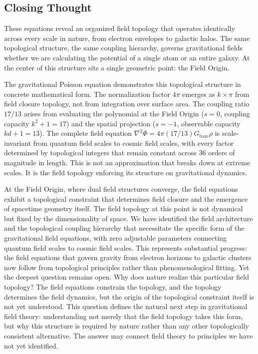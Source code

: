 \documentclass[aps,prd,preprint,superscriptaddress,showpacs,preprintnumbers,amsmath,amssymb,nofootinbib]{revtex4-2}
\begin{document}
\subsection{Closing Thought}
\label{subsec:closing}

These equations reveal an organized field topology that operates identically across every scale in nature, from electron envelopes to galactic halos. The same topological structure, the same coupling hierarchy, governs gravitational fields whether we are calculating the potential of a single atom or an entire galaxy. At the center of this structure sits a single geometric point: the Field Origin.

The gravitational Poisson equation demonstrates this topological structure in concrete mathematical form. The normalization factor $4\pi$ emerges as $k\times\pi$ from field closure topology, not from integration over surface area. The coupling ratio $17/13$ arises from evaluating the polynomial at the Field Origin ($s=0$, coupling capacity $k^2+1=17$) and the spatial projection ($s=-1$, observable capacity $kd+1=13$). The complete field equation $\nabla^2\Phi = 4\pi(17/13)G_{\text{bare}}\rho$ is scale-invariant from quantum field scales to cosmic field scales, with every factor determined by topological integers that remain constant across 36 orders of magnitude in length. This is not an approximation that breaks down at extreme scales. It is the field topology enforcing its structure on gravitational dynamics.

At the Field Origin, where dual field structures converge, the field equations exhibit a topological constraint that determines field closure and the emergence of spacetime geometry itself. The field topology at this point is not dynamical but fixed by the dimensionality of space. We have identified the field architecture and the topological coupling hierarchy that necessitate the specific form of the gravitational field equations, with zero adjustable parameters connecting quantum field scales to cosmic field scales. This represents substantial progress: the field equations that govern gravity from electron horizons to galactic clusters now follow from topological principles rather than phenomenological fitting. Yet the deepest question remains open. Why does nature realize this particular field topology? The field equations constrain the topology, and the topology determines the field dynamics, but the origin of the topological constraint itself is not yet understood. This question defines the natural next step in gravitational field theory: understanding not merely that the field topology takes this form, but why this structure is required by nature rather than any other topologically consistent alternative. The answer may connect field theory to principles we have not yet identified.
\end{document}
